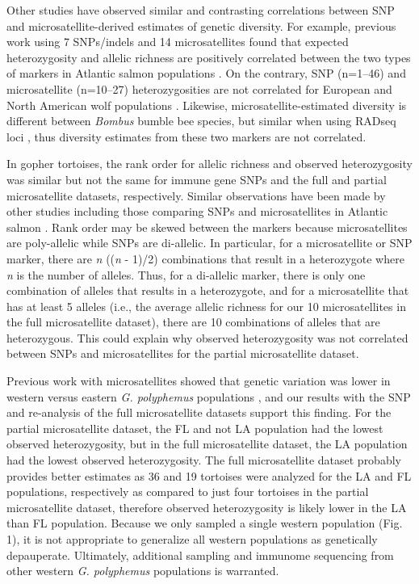\documentclass[english]{article}\usepackage[]{graphicx}\usepackage[]{color}
\begin{document}
Other studies have observed similar and contrasting correlations between SNP and microsatellite-derived estimates of genetic diversity. For example, previous work using 7 SNPs/indels and 14 microsatellites found that expected heterozygosity and allelic richness are positively correlated between the two types of markers in Atlantic salmon populations \citep{Ryynanen_et_al_2007}. On the contrary, SNP (n=1--46) and microsatellite (n=10--27) heterozygosities are not correlated for European and North American wolf populations \citep{Vali_et_al_2008}. Likewise, microsatellite-estimated diversity is different between \textit{Bombus} bumble bee species, but similar when using RADseq loci \citep{Lozier_2014}, thus diversity estimates from these two markers are not correlated.

In gopher tortoises, the rank order for allelic richness and observed heterozygosity was similar but not the same for immune gene SNPs and the full and partial microsatellite datasets, respectively. Similar observations have been made by other studies including those comparing SNPs and microsatellites in Atlantic salmon \citep{Ryynanen_et_al_2007}. Rank order may be skewed between the markers because microsatellites are poly-allelic while SNPs are di-allelic. In particular, for a microsatellite or SNP marker, there are \textit{n} ((\textit{n} - 1)/2) combinations that result in a heterozygote where \textit{n} is the number of alleles. Thus, for a di-allelic marker, there is only one combination of alleles that results in a heterozygote, and for a microsatellite that has at least 5 alleles (i.e., the average allelic richness for our 10 microsatellites in the full microsatellite dataset), there are 10 combinations of alleles that are heterozygous. This could explain why observed heterozygosity was not correlated between SNPs and microsatellites for the partial microsatellite dataset.

Previous work with microsatellites showed that genetic variation was lower in western versus eastern \textit{G. polyphemus} populations \citep{Ennen_et_al_2010}, and our results with the SNP and re-analysis of the full microsatellite datasets support this finding. For the partial microsatellite dataset, the FL and not LA population had the lowest observed heterozygosity, but in the full microsatellite dataset, the LA population had the lowest observed heterozygosity. The full microsatellite dataset probably provides better estimates as 36 and 19 tortoises were analyzed for the LA and FL populations, respectively as compared to just four tortoises in the partial microsatellite dataset, therefore observed heterozygosity is likely lower in the LA than FL population. Because we only sampled a single western population (Fig. 1), it is not appropriate to generalize all western populations as genetically depauperate. Ultimately, additional sampling and immunome sequencing from other western \textit{G. polyphemus} populations is warranted.
\end{document}
